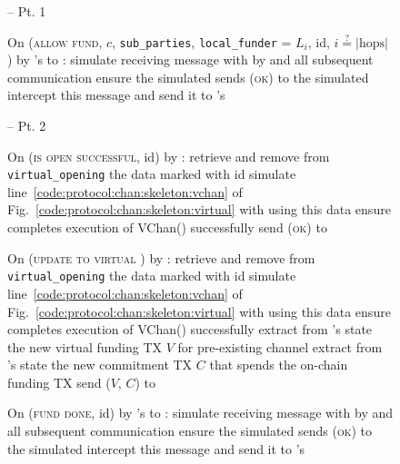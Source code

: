 \begin{figure}[H]
\begin{simulatorbox}{\simulator -- Pt. 1}
\begin{algorithmic}[1]
      \State On (\textsc{allow fund}, $c$, \texttt{sub\_parties},
      \texttt{local\_funder} = $L_i$, id, $i \overset{?}{=} |\mathrm{hops}|$) by
      \fchan's \alice to \charlie:
      \Indent
        \State simulate receiving message with \charlie by \alice and all
        subsequent communication
        \State ensure the simulated \charlie sends (\textsc{ok}) to the
        simulated \alice
        \State intercept this message and send it to \fchan's \alice
      \EndIndent
    \end{algorithmic}
  \end{simulatorbox}
  \caption{}
  \label{code:simulator:pt1}
\end{figure}

\begin{figure}[H]
  \begin{simulatorbox}{\simulator -- Pt. 2}
    \begin{algorithmic}[1]
      \State On (\textsc{is open successful}, id) by \fchan:
      \Indent
        \State retrieve and remove from \texttt{virtual\_opening} the data
        marked with id
        \State simulate line~\ref{code:protocol:chan:skeleton:vchan} of
        Fig.~\ref{code:protocol:chan:skeleton:virtual} with \alice using this
        data
        \State ensure \alice completes execution of VChan() successfully
        \State send (\textsc{ok}) to \fchan
      \EndIndent
      \Statex

      \State On (\textsc{update to virtual} ) by \fchan:
      \Indent
        \State retrieve and remove from \texttt{virtual\_opening} the data
        marked with id
        \State simulate line~\ref{code:protocol:chan:skeleton:vchan} of
        Fig.~\ref{code:protocol:chan:skeleton:virtual} with \alice using this
        data
        \State ensure \alice completes execution of VChan() successfully
        \State extract from \alice's state the new virtual funding TX $V$ for
        pre-existing channel
        \State extract from \alice's state the new commitment TX $C$ that spends
        the on-chain funding TX
        \State send ($V$, $C$) to \fchan
      \EndIndent
      \Statex

      \State On (\textsc{fund done}, id) by \fchan's \alice to \charlie:
      \Indent
        \State simulate receiving message with \charlie by \alice and all
        subsequent communication
        \State ensure the simulated \charlie sends (\textsc{ok}) to the
        simulated \alice
        \State intercept this message and send it to \fchan's \alice
      \EndIndent
    \end{algorithmic}
  \end{simulatorbox}
  \caption{}
  \label{code:simulator}
\end{figure}
